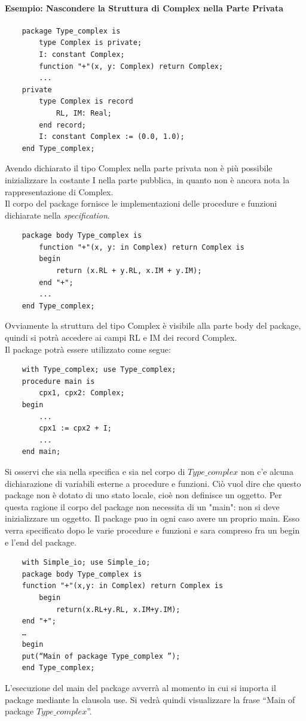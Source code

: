 \documentclass{article}
\begin{document}
	\paragraph{Esempio: Nascondere la Struttura di Complex nella Parte Privata}
	\begin{verbatim}
	package Type_complex is
	    type Complex is private;
	    I: constant Complex;
	    function "+"(x, y: Complex) return Complex;
	    ...
	private
	    type Complex is record
	        RL, IM: Real;
	    end record;
	    I: constant Complex := (0.0, 1.0);
	end Type_complex;
	\end{verbatim}
	Avendo dichiarato il tipo Complex nella parte privata non è	più possibile inizializzare la costante I nella parte pubblica, in quanto non è ancora nota la rappresentazione di Complex.
	\vspace{\baselineskip} \\
	Il corpo del package fornisce le implementazioni delle procedure e funzioni dichiarate nella \textit{specification}.
	\begin{verbatim}
	package body Type_complex is
	    function "+"(x, y: in Complex) return Complex is
	    begin
	        return (x.RL + y.RL, x.IM + y.IM);
	    end "+";
	    ...
	end Type_complex;
	\end{verbatim}
	Ovviamente la struttura del tipo Complex è visibile alla parte body del package, quindi si potrà accedere ai campi RL e IM dei record Complex. \\
	Il package potrà essere utilizzato come segue:
	\begin{verbatim}
	with Type_complex; use Type_complex;
	procedure main is
	    cpx1, cpx2: Complex;
	begin
	    ...
	    cpx1 := cpx2 + I;
	    ...
	end main;
	\end{verbatim}
	Si osservi che sia nella specifica e sia nel corpo di $Type\_complex$ non c'e alcuna dichiarazione di variabili esterne a procedure e funzioni. Ciò vuol dire che questo package non è dotato di uno stato locale, cioè non definisce un oggetto. Per questa ragione il corpo del package non necessita di un "main": non si deve inizializzare un oggetto. Il package puo in ogni caso avere un proprio main. Esso verra specificato dopo le varie procedure e funzioni e sara compreso fra un begin e l'end del package.
	\begin{verbatim}
	with Simple_io; use Simple_io;
	package body Type_complex is
	function "+"(x,y: in Complex) return Complex is
		begin
			return(x.RL+y.RL, x.IM+y.IM);
	end "+";
	…
	begin
	put(“Main of package Type_complex ”);
	end Type_complex;
	\end{verbatim}
	L'esecuzione del main del package avverrà al momento in cui si importa il package mediante la clausola use. Si vedrà quindi visualizzare la frase “Main of package $Type\_complex$”.
\end{document}
